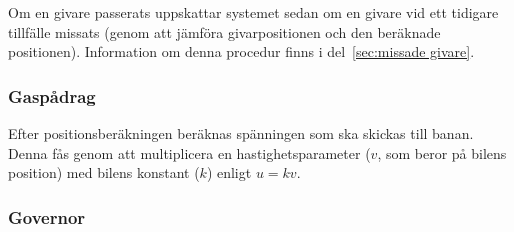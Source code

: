 Om en givare passerats uppskattar systemet sedan om en givare vid ett tidigare
tillfälle missats (genom att jämföra givarpositionen och den beräknade
positionen). Information om denna procedur finns i del~\ref{sec:missade givare}.


\subsubsection{Gaspådrag}

Efter positionsberäkningen beräknas spänningen som ska skickas till banan. Denna
fås genom att multiplicera en hastighetsparameter ($v$, som beror på bilens
position) med bilens konstant ($k$) enligt $u = kv$.


% 
%  

\subsubsection{Governor}
\label{sec:systembeskrivning:governor}

